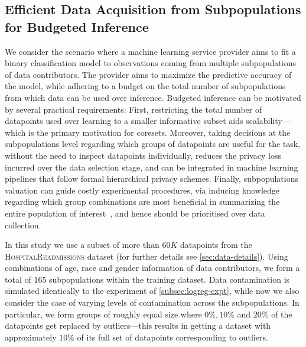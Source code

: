 \subsection{Efficient Data Acquisition from Subpopulations for Budgeted Inference}
\label{sec:active-selection}


We consider the scenario where a machine learning service provider aims to fit a binary classification model to observations coming from multiple subpopulations of data contributors. The provider aims to maximize the predictive accuracy of the model, while adhering to a budget on the total number of subpopulations from which data can be used over inference. Budgeted inference can be motivated by several practical requirements: First, restricting the total number of datapoints used over learning to a smaller informative subset aids scalability---which is the primary motivation for coresets. Moreover, taking decisions at the subpopulations level regarding which groups of datapoints are useful for the task, without the need to inspect datapoints individually, reduces the privacy loss incurred over the data selection stage, and can be integrated in machine learning pipelines that follow formal hierarchical privacy schemes. Finally, subpopulations valuation can guide costly experimental procedures, via inducing knowledge regarding which group combinations are most beneficial in summarizing the entire population of interest~\citep{pinsler19, vahidian20}, and hence should be prioritised over data collection.

In this study we use a subset of more than $60K$ datapoints from the \textsc{HospitalReadmissions} dataset (for further details see \cref{sec:data-details}). Using combinations of age, race and gender information of data contributors, we form a total of $165$ subpopulations within the training dataset. Data contamination is simulated identically to the experiment of \cref{subsec:logreg-expt}, while now we also consider the case of varying levels of contamination across the subpopulations. In particular, we form groups of roughly equal size where $0\%, 10\%$ and $20\%$ of the datapoints get replaced by outliers---this results in getting a dataset with approximately $10\%$ of its full set of datapoints corresponding to outliers.



